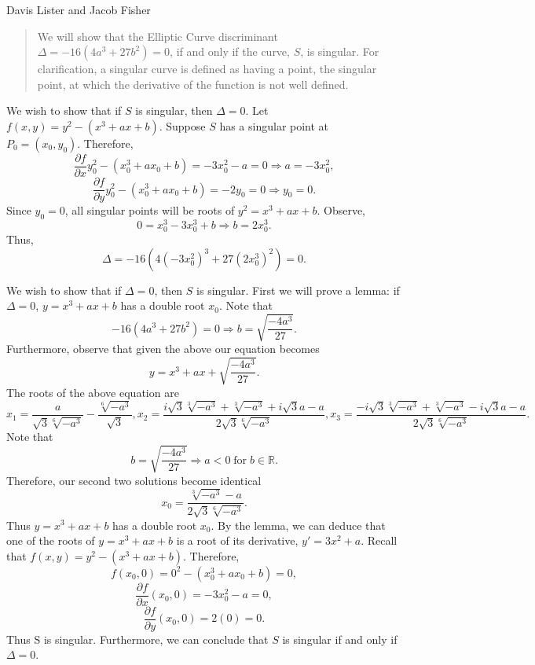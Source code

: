 \documentclass{article}
\DeclareMathOperator{\for}{for}
\begin{document}
Davis Lister and Jacob Fisher

\begin{abstract}
We will show that the Elliptic Curve discriminant $\Delta=-16(4a^3+27b^2)=0$, if and only if the curve, $S$, is singular. For clarification, a singular curve is defined as having a point, the singular point, at which the derivative of the function is not well defined.
\end{abstract}

We wish to show that if $S$ is singular, then $\Delta=0$.
Let $f(x,y)=y^2-(x^3+ax+b)$. Suppose $S$ has a singular point at $P_0=(x_0, y_0)$. Therefore,
$$\frac{\partial f}{\partial x} y_0^2-(x_0^3+ax_0+b)=-3x_0^2-a=0 \Longrightarrow a=-3x_0^2,$$
$$\frac{\partial f}{\partial y} y_0^2-(x_0^3+ax_0+b)=-2y_0=0 \Longrightarrow y_0=0.$$
Since $y_0=0$, all singular points will be roots of $y^2=x^3+ax+b$. Observe,
$$0=x_0^3-3x_0^3+b \Longrightarrow b=2x_0^3.$$
Thus,
$$\Delta=-16(4(-3x_0^2)^3+27(2x_0^3)^2)=0.$$

\indent We wish to show that if $\Delta=0$, then $S$ is singular. First we will prove a lemma: if $\Delta=0$, $y=x^3+ax+b$ has a double root $x_0$. Note that
$$-16(4a^3+27b^2)=0 \Longrightarrow b = \sqrt{\frac{-4a^3}{27}}.$$
Furthermore, observe that given the above our equation becomes
$$y=x^3+ax+\sqrt{\frac{-4a^3}{27}}.$$
The roots of the above equation are
$$x_1=\frac{a}{\sqrt{3}\sqrt[6]{-a^3}}-\frac{\sqrt[6]{-a^3}}{\sqrt{3}}, x_2=\frac{i\sqrt{3}\sqrt[3]{-a^3}+\sqrt[3]{-a^3}+i\sqrt{3}a-a}{2\sqrt{3}\sqrt[6]{-a^3}}, x_3=\frac{-i\sqrt{3}\sqrt[3]{-a^3}+\sqrt[3]{-a^3}-i\sqrt{3}a-a}{2\sqrt{3}\sqrt[6]{-a^3}}.$$
Note that
$$b=\sqrt{\frac{-4a^3}{27}} \Longrightarrow a<0 \for b \in \mathbb{R}.$$
Therefore, our second two solutions become identical
$$x_0=\frac{\sqrt[3]{-a^3}-a}{2\sqrt{3}\sqrt[6]{-a^3}}.$$
Thus $y=x^3+ax+b$ has a double root $x_0$.
By the lemma, we can deduce that one of the roots of $y=x^3+ax+b$ is a root of its derivative, $y'=3x^2+a$. Recall that $f(x,y)=y^2-(x^3+ax+b)$. Therefore,
$$f(x_0,0)=0^2-(x_0^3+ax_0+b)=0,$$
$$\frac{\partial f}{\partial x} (x_0,0)=-3x_0^2-a=0,$$
$$\frac{\partial f}{\partial y} (x_0,0)=2(0)=0.$$
Thus S is singular. Furthermore, we can conclude that $S$ is singular if and only if $\Delta=0$. 
\end{document}
